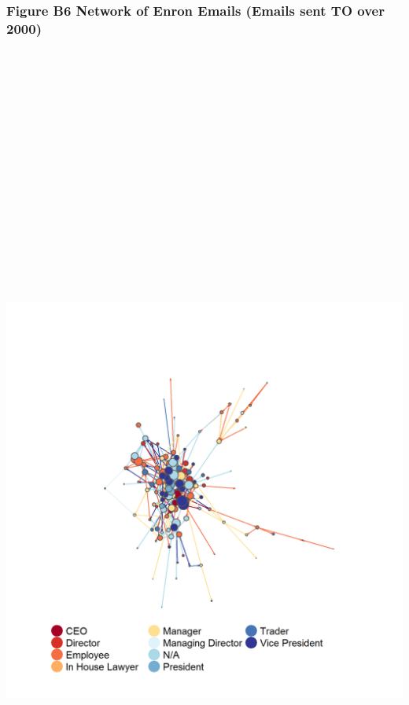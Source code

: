 \documentclass[]{article}
\begin{document}
\newpage

\subsubsection{Figure B6 Network of Enron Emails (Emails sent TO over
2000)}\label{figure-b6-network-of-enron-emails-emails-sent-to-over-2000}

\section{\texorpdfstring{\protect\includegraphics[height=12.50000in]{images/n_to_00.png}}{Network of Enron Emails}}\label{network-of-enron-emails-3}
\end{document}
